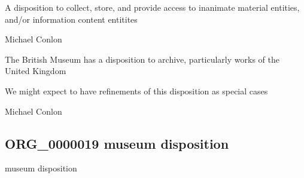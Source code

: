 \documentclass[letterpaper,10pt,english]{sphinxmanual}
\begin{document}
\begin{sphinxShadowBox}

\sphinxAtStartPar
A disposition to collect, store, and provide access to inanimate material entities, and/or information content entitites
\end{sphinxShadowBox}

\begin{sphinxShadowBox}

\sphinxAtStartPar
Michael Conlon 
\end{sphinxShadowBox}

\begin{sphinxShadowBox}

\sphinxAtStartPar
The British Museum has a disposition to archive, particularly works of the United Kingdom
\end{sphinxShadowBox}

\begin{sphinxShadowBox}

\sphinxAtStartPar
We might expect to have refinements of this disposition as special cases
\end{sphinxShadowBox}

\begin{sphinxShadowBox}

\sphinxAtStartPar
Michael Conlon 
\end{sphinxShadowBox}
\begin{quote}

\ignorespaces \end{quote}


\subsection{ORG\_0000019 \sphinxhyphen{} museum disposition}
\label{\detokenize{doc-ORG_0000019:org-0000019-museum-disposition}}\label{\detokenize{doc-ORG_0000019:index-0}}\label{\detokenize{doc-ORG_0000019::doc}}
\begin{sphinxShadowBox}

\sphinxAtStartPar
museum disposition
\end{sphinxShadowBox}
\end{document}

